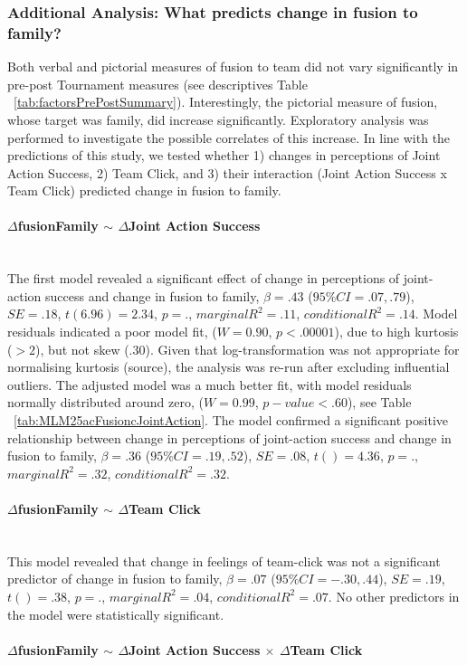 \documentclass[12pt]{report}
\newcommand{\myparagraph}[1]{\paragraph{#1}\mbox{}\\}
\begin{document}
{\subsubsection{Additional Analysis: What predicts change in fusion to family?}
Both verbal and pictorial measures of fusion to team did not vary significantly in pre-post Tournament measures (see descriptives Table ~\ref{tab:factorsPrePostSummary}).  Interestingly, the pictorial measure of fusion, whose target was family, did increase significantly.  Exploratory analysis was performed to investigate the possible correlates of this increase. In line with the predictions of this study, we tested whether 1) changes in perceptions of Joint Action Success, 2) Team Click, and 3) their interaction (Joint Action Success x Team Click) predicted change in fusion to family.

\myparagraph{$\Delta$fusionFamily $\sim$ $\Delta$Joint Action Success}
The first model revealed a significant effect of change in perceptions of joint-action success and change in fusion to family, $\beta = .43$ ($95\% CI =  .07, .79$), $SE = .18$, $t(6.96) = 2.34$, $p = .$, $marginal R^2 = .11$, $conditional R^2 = .14$.  Model residuals indicated a poor model fit, ($W = 0.90$, $p < .00001$), due to high kurtosis ($> 2$), but not skew (.30). Given that log-transformation was not appropriate for normalising kurtosis (source), the analysis was re-run after excluding influential outliers.  The adjusted model was a much better fit, with model residuals normally distributed around zero, ($W = 0.99$, $p-value < .60$), see Table ~\ref{tab:MLM25acFusioncJointAction}. The model confirmed a significant positive relationship between change in perceptions of joint-action success and change in fusion to family, $\beta = .36$ ($95\% CI =  .19, .52$), $SE = .08$, $t() = 4.36$, $p = .$, $marginal R^2 = .32$, $conditional R^2 = .32$.



\myparagraph{$\Delta$fusionFamily $\sim$ $\Delta$Team Click}

This model revealed that change in feelings of team-click was not a significant predictor of change in fusion to family, $\beta = .07$ ($95\% CI =  -.30, .44$), $SE = .19$, $t() = .38$, $p = .$, $marginal R^2 = .04$, $conditional R^2 = .07$. No other predictors in the model were statistically significant.

\myparagraph{$\Delta$fusionFamily $\sim$  $\Delta$Joint Action Success $\times$ $\Delta$Team Click}

}
\end{document}
